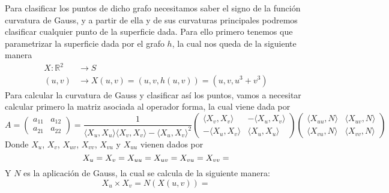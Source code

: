 \documentclass[fleqn]{article}
\def\R{\mathds{R}}
\begin{document}
    Para clasificar los puntos de dicho grafo necesitamos saber el signo de la función curvatura de Gauss, y a partir de ella y de sus curvaturas principales podremos clasificar cualquier punto
    de la superficie dada. Para ello primero tenemos que parametrizar la superficie dada por el grafo $h$, la cual nos queda de la siguiente manera
    \begin{equation*}
        \begin{aligned}
            X: \R^2 &\longrightarrow S \\
            (u,v) &\longrightarrow X(u, v) = (u, v, h(u,v)) = (u, v, u^3 + v^3)
        \end{aligned}
    \end{equation*}
    Para calcular la curvatura de Gauss y clasificar así los puntos, vamos a necesitar calcular primero la matriz asociada al operador forma, la cual viene dada por 
    \begin{equation*}
        A =
        \begin{pmatrix}
            a_{11} & a_{12} \\
            a_{21} & a_{22}
        \end{pmatrix}
        = \frac{1}{\langle X_u, X_u \rangle \langle X_v, X_v \rangle - \langle X_u, X_v \rangle ^2}
        \begin{pmatrix}
            \langle X_v, X_v \rangle & - \langle X_u, X_v \rangle \\
            -\langle X_u, X_v \rangle & \langle X_u, X_u \rangle
        \end{pmatrix}
        \begin{pmatrix}
            \langle X_{uu}, N \rangle & \langle X_{uv}, N \rangle \\
            \langle X_{vu}, N \rangle & \langle X_{vv}, N \rangle
        \end{pmatrix}
    \end{equation*}
    Donde $X_u$, $X_v$, $X_{uv}$, $X_{vv}$, $X_{vu}$ y $X_{uu}$ vienen dados por
    \begin{equation*}
        X_u =  \\
        X_v =  \\
        X_{uu} = \\
        X_{uv} = \\
        X_{vu} = \\
        X_{vv} = 
    \end{equation*}
    Y $N$ es la aplicación de Gauss, la cual se calcula de la siguiente manera:
    \begin{equation*}
        X_u \times X_v = 
        N(X(u,v)) = 
    \end{equation*}
\end{document}
